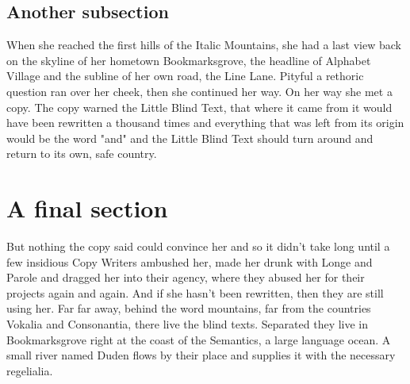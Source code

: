 \documentclass[11pt]{article}
\begin{document}
\subsection{Another subsection}

When she reached the first hills of the Italic Mountains, she had a last view back on the skyline of her hometown Bookmarksgrove, the headline of Alphabet Village and the subline of her own road, the Line Lane. Pityful a rethoric question ran over her cheek, then she continued her way. On her way she met a copy. The copy warned the Little Blind Text, that where it came from it would have been rewritten a thousand times and everything that was left from its origin would be the word "and" and the Little Blind Text should turn around and return to its own, safe country.

\section{A final section}

But nothing the copy said could convince her and so it didn’t take long until a few insidious Copy Writers ambushed her, made her drunk with Longe and Parole and dragged her into their agency, where they abused her for their projects again and again. And if she hasn’t been rewritten, then they are still using her. Far far away, behind the word mountains, far from the countries Vokalia and Consonantia, there live the blind texts. Separated they live in Bookmarksgrove right at the coast of the Semantics, a large language ocean. A small river named Duden flows by their place and supplies it with the necessary regelialia.

\newpage

\printbibliography
\end{document}
